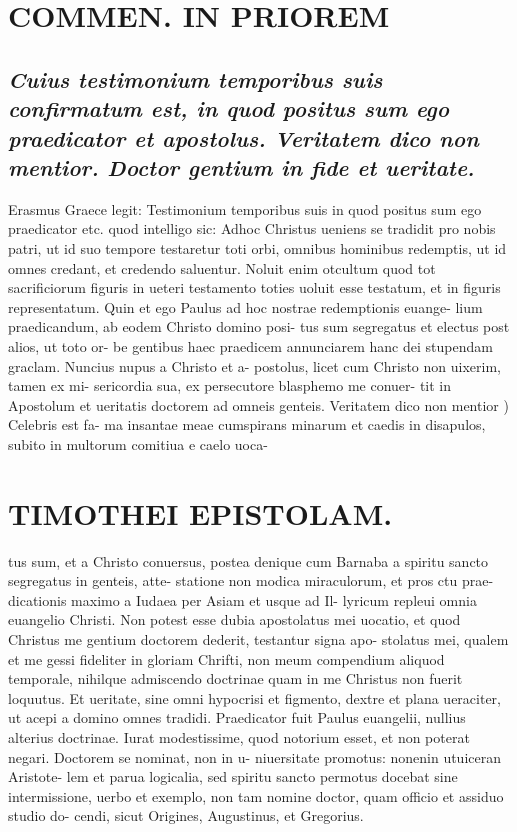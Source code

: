 \documentclass{article}
\begin{document}
\begin{pages}
\section*{COMMEN. IN PRIOREM }
\marginpar{[ p.52 ]}
\marginpar{[ p.53 ]}
{}
\subsection*{\textit{Cuius testimonium temporibus suis confirmatum est, in quod positus sum ego praedicator et apostolus. Veritatem dico non mentior. Doctor gentium in fide et ueritate. }}\pstart Erasmus Graece legit: Testimonium temporibus suis in quod positus sum ego praedicator etc. quod intelligo sic: Adhoc Christus ueniens se tradidit pro nobis patri, ut id suo tempore testaretur toti orbi, omnibus hominibus redemptis, ut id omnes credant, et credendo saluentur. Noluit enim otcultum quod tot sacrificiorum figuris in ueteri testamento toties uoluit esse testatum, et in figuris representatum. Quin et ego Paulus ad hoc nostrae redemptionis euange- lium praedicandum, ab eodem Christo domino posi- tus sum segregatus et electus post alios, ut toto or- be gentibus haec praedicem annunciarem hanc dei stupendam graclam. Nuncius nupus a Christo et a- postolus, licet cum Christo non uixerim, tamen ex mi- sericordia sua, ex persecutore blasphemo me conuer- tit in Apostolum et ueritatis doctorem ad omneis genteis.  \pend\pstart Veritatem dico non mentior ) Celebris est fa- ma insantae meae cumspirans minarum et caedis in disapulos, subito in multorum comitiua e caelo uoca-  \pend
\section*{TIMOTHEI EPISTOLAM. }
\marginpar{[ p.54 ]}\pstart tus sum, et a Christo conuersus, postea denique cum Barnaba a spiritu sancto segregatus in genteis, atte- statione non modica miraculorum, et pros ctu prae- dicationis maximo a Iudaea per Asiam et usque ad Il- lyricum repleui omnia euangelio Christi. Non potest esse dubia apostolatus mei uocatio, et quod Christus me gentium doctorem dederit, testantur signa apo- stolatus mei, qualem et me gessi fideliter in gloriam Chrifti, non meum compendium aliquod temporale, nihilque admiscendo doctrinae quam in me Christus non fuerit loquutus. Et ueritate, sine omni hypocrisi et figmento, dextre et plana ueraciter, ut acepi a domino omnes tradidi.  \pend\pstart Praedicator fuit Paulus euangelii, nullius alterius doctrinae. Iurat modestissime, quod notorium esset, et non poterat negari. Doctorem se nominat, non in u- niuersitate promotus: nonenin utuiceran Aristote- lem et parua logicalia, sed spiritu sancto permotus docebat sine intermissione, uerbo et exemplo, non tam nomine doctor, quam officio et assiduo studio do- cendi, sicut Origines, Augustinus, et Gregorius.  \pend
{}
{}

\end{pages}
\end{document}
